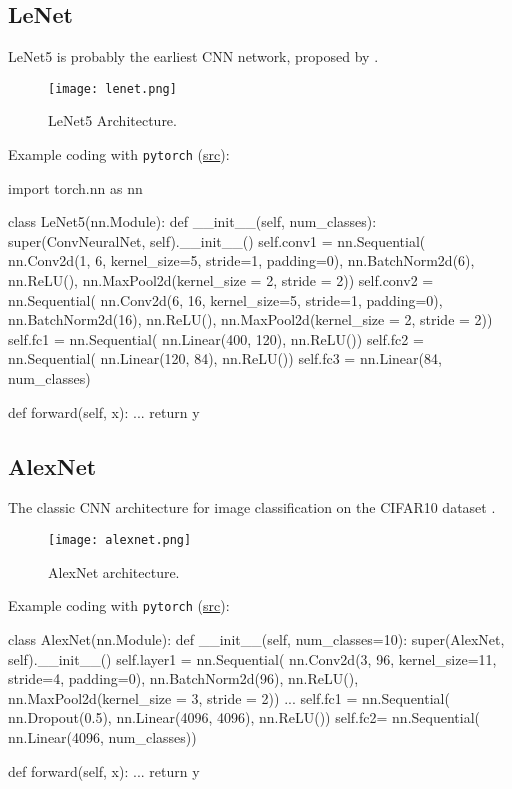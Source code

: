 \subsection{LeNet}
LeNet5 is probably the earliest \ac{CNN} network, proposed by .

\begin{figure}[hbt!]
	\centering
	\texttt{[image: lenet.png]}
	\caption{LeNet5 Architecture. \cite{lecun1998gradient}}
\end{figure}

Example coding with \texttt{pytorch} (\href{https://blog.paperspace.com/writing-lenet5-from-scratch-in-python/}{src}):
\begin{python}
import torch.nn as nn

class LeNet5(nn.Module):
	def __init__(self, num_classes):
		super(ConvNeuralNet, self).__init__()
		self.conv1 = nn.Sequential(
			nn.Conv2d(1, 6, kernel_size=5, stride=1, padding=0),
			nn.BatchNorm2d(6),
			nn.ReLU(),
			nn.MaxPool2d(kernel_size = 2, stride = 2))
		self.conv2 = nn.Sequential(
			nn.Conv2d(6, 16, kernel_size=5, stride=1, padding=0),
			nn.BatchNorm2d(16),
			nn.ReLU(),
			nn.MaxPool2d(kernel_size = 2, stride = 2))
		self.fc1 = nn.Sequential(
			nn.Linear(400, 120),
			nn.ReLU())
		self.fc2 = nn.Sequential(
			nn.Linear(120, 84),
			nn.ReLU())
		self.fc3 = nn.Linear(84, num_classes)
	
	def forward(self, x):
		...
		return y
\end{python}

\subsection{AlexNet}
The classic \ac{CNN} architecture for image classification on the CIFAR10 dataset \cite{krizhevsky2012imagenet}.

\begin{figure}[hbt!]
	\centering
	\texttt{[image: alexnet.png]}
	\caption{AlexNet architecture. \cite{krizhevsky2012imagenet}}
\end{figure}

Example coding with \texttt{pytorch} (\href{https://blog.paperspace.com/alexnet-pytorch/}{src}):
\begin{python}	
class AlexNet(nn.Module):
	def __init__(self, num_classes=10):
		super(AlexNet, self).__init__()
		self.layer1 = nn.Sequential(
			nn.Conv2d(3, 96, kernel_size=11, stride=4, padding=0),
			nn.BatchNorm2d(96),
			nn.ReLU(),
			nn.MaxPool2d(kernel_size = 3, stride = 2))
		...
		self.fc1 = nn.Sequential(
			nn.Dropout(0.5),
			nn.Linear(4096, 4096),
			nn.ReLU())
		self.fc2= nn.Sequential(
			nn.Linear(4096, num_classes))
			
	def forward(self, x):
		...
		return y
\end{python}

